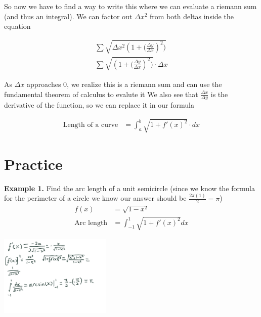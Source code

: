 \documentclass[12pt]{extarticle}
\begin{document}
So now we have to find a way to write this where we can evaluate a riemann sum (and thus an integral).
We can factor out $\Delta x^2$ from both deltas inside the equation

\begin{align}   
    \sum \sqrt{{\Delta x^2}(1 + {(\frac{\Delta y}{\Delta x}})^2)} \\
    \sum \sqrt{(1 + {(\frac{\Delta y}{\Delta x}})^2)} \cdot \Delta x
\end{align}

As $\Delta x$ approaches 0, we realize this is a riemann sum and can use the fundamental theorem of calculus to evalute it 
We also see that $\frac{\Delta x}{\Delta y}$ is the derivative of the function, so we can replace it in our formula

\begin{align}
    \text{Length of a curve} &= \int_{a}^{b} \sqrt{1 + f'(x)^2} \cdot dx
\end{align}

\section{Practice}
\textbf{Example 1.} Find the arc length of a unit semicircle (since we know the formula for the perimeter of a circle we know our answer should be $\frac{2\pi (1)}{2} = \pi$)
\begin{align}
    f(x) &= \sqrt{1-x^2} \\
    \text{Arc length} &= \int_{-1}^{1} \sqrt{1 + f'(x)^2} dx 
\end{align}

\begin{center}
\end{center}

\begin{center}
    \includegraphics[width = 0.4\textwidth]{assignment0001.png}
\end{center}
\end{document}
